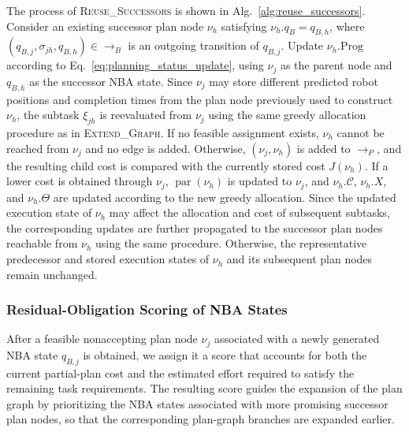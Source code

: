 \documentclass[lettersize,journal]{IEEEtran}
\theoremstyle{italiclemma}
\theoremstyle{italiclemma}
\theoremstyle{definition}
\begin{document}
The process of \textsc{Reuse\_Successors} is shown in Alg.~\ref{alg:reuse_successors}.
Consider an existing successor plan node $\nu_h$ satisfying
$\nu_h.q_B=q_{B,h}$, where $(q_{B,j},\sigma_{jh},q_{B,h})\in\rightarrow_B$ is an outgoing transition of $q_{B,j}$. Update $\nu_h.\mathrm{Prog}$ according to Eq.~\eqref{eq:planning_status_update}, using $\nu_j$ as the parent node and $q_{B,h}$ as the successor NBA state.
Since $\nu_j$ may store different predicted robot positions and completion times from the plan node
previously used to construct $\nu_h$, the subtask $\xi_{jh}$ is reevaluated from $\nu_j$ using the same greedy allocation procedure as in \textsc{Extend\_Graph}. If no feasible assignment exists, $\nu_h$ cannot be reached from $\nu_j$ and no edge is added. Otherwise, $(\nu_j,\nu_h)$ is added to $\rightarrow_P$, and the resulting child cost is compared with the currently stored cost $J(\nu_h)$. If a lower cost is obtained through $\nu_j$, $\operatorname{par}(\nu_h)$ is updated to $\nu_j$, and
$\nu_h.\mathcal C$, $\nu_h.X$, and $\nu_h.\Theta$ are updated according to the new greedy allocation. Since the updated execution state of $\nu_h$ may affect the allocation and cost of subsequent subtasks, the corresponding updates are further propagated to the
successor plan nodes reachable from $\nu_h$ using the same procedure. Otherwise, the representative predecessor and stored execution states of $\nu_h$ and its subsequent plan nodes remain unchanged.



\subsubsection{Residual-Obligation Scoring of NBA States}
\label{subsec:residual_score}
After a feasible nonaccepting plan node $\nu_j$ associated with a newly generated NBA state $q_{B,j}$ is obtained, we assign it a score that accounts for both the current partial-plan cost and the estimated effort required to satisfy the remaining task requirements. The resulting score guides the expansion of the plan graph by prioritizing the NBA states associated with more promising successor plan nodes, so that the corresponding plan-graph branches are expanded earlier.
\end{document}
